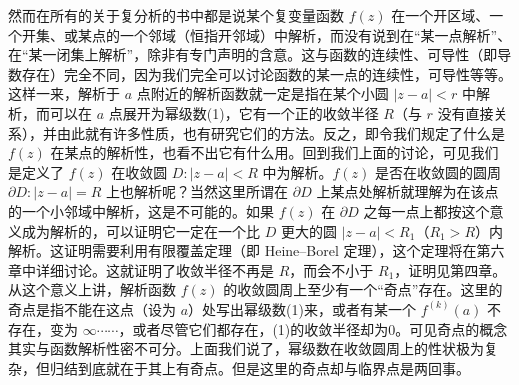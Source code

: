 然而在所有的关于复分析的书中都是说某个复变量函数 $f(z)$ 在一个开区域、一个开集、或某点的一个邻域（恒指开邻域）中解析，而没有说到在“某一点解析”、在“某一闭集上解析”，除非有专门声明的含意。这与函数的连续性、可导性（即导数存在）完全不同，因为我们完全可以讨论函数的某一点的连续性，可导性等等。这样一来，解析于 $a$ 点附近的解析函数就一定是指在某个小圆 $|z-a|<r$ 中解析，而可以在 $a$ 点展开为幂级数(1)，它有一个正的收敛半径 $R$（与 $r$ 没有直接关系），并由此就有许多性质，也有研究它们的方法。反之，即令我们规定了什么是 $f(z)$ 在某点的解析性，也看不出它有什么用。回到我们上面的讨论，可见我们是定义了 $f(z)$ 在收敛圆 $D:|z-a|<R$ 中为解析。$f(z)$ 是否在收敛圆的圆周 $\partial D:|z-a|=R$ 上也解析呢？当然这里所谓在 $\partial D$ 上某点处解析就理解为在该点的一个小邻域中解析，这是不可能的。如果 $f(z)$ 在 $\partial D$ 之每一点上都按这个意义成为解析的，可以证明它一定在一个比 $D$ 更大的圆 $|z-a|<R_1$（$R_1>R$）内解析。这证明需要利用有限覆盖定理（即 Heine--Borel 定理），这个定理将在第六章中详细讨论。这就证明了收敛半径不再是 $R$，而会不小于 $R_1$，证明见第四章。从这个意义上讲，解析函数 $f(z)$ 的收敛圆周上至少有一个“奇点”存在。这里的奇点是指不能在这点（设为 $a$）处写出幂级数(1)来，或者有某一个 $f^{(k)}(a)$ 不存在，变为 $\infty\cdots\cdots$，或者尽管它们都存在，(1)的收敛半径却为0。可见奇点的概念其实与函数解析性密不可分。上面我们说了，幂级数在收敛圆周上的性状极为复杂，但归结到底就在于其上有奇点。但是这里的奇点却与临界点是两回事。

